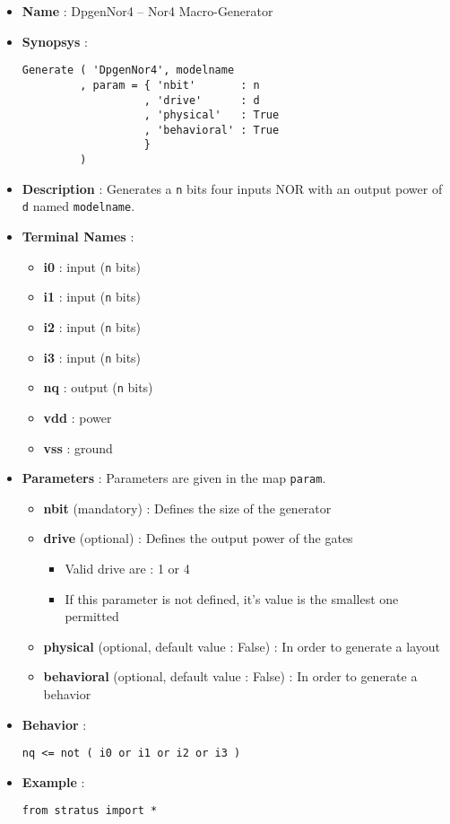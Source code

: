 \begin{itemize}
    \item \textbf{Name} : DpgenNor4 -- Nor4 Macro-Generator
    \item \textbf{Synopsys} :
\begin{verbatim}
Generate ( 'DpgenNor4', modelname
         , param = { 'nbit'       : n
                   , 'drive'      : d 
                   , 'physical'   : True
                   , 'behavioral' : True                   
                   }
         )
\end{verbatim}
    \item \textbf{Description} : Generates a \verb-n- bits four inputs NOR with an output power of \verb-d- named \verb-modelname-.
    \item \textbf{Terminal Names} :
    \begin{itemize}
        \item \textbf{i0} : input (\verb-n- bits)
        \item \textbf{i1} : input (\verb-n- bits)
        \item \textbf{i2} : input (\verb-n- bits)
        \item \textbf{i3} : input (\verb-n- bits)
        \item \textbf{nq} : output (\verb-n- bits)
        \item \textbf{vdd} : power
        \item \textbf{vss} : ground
    \end{itemize}
    \item \textbf{Parameters} : Parameters are given in the map \verb-param-.
    \begin{itemize}
        \item \textbf{nbit} (mandatory) : Defines the size of the generator
        \item \textbf{drive} (optional) : Defines the output power of the gates
        \begin{itemize}
            \item Valid drive are : 1 or 4
            \item If this parameter is not defined, it's value is the smallest one permitted
        \end{itemize}
        \item \textbf{physical} (optional, default value : False) : In order to generate a layout
        \item \textbf{behavioral} (optional, default value : False) : In order to generate a behavior        
    \end{itemize}
    \item \textbf{Behavior} :
\begin{verbatim}
nq <= not ( i0 or i1 or i2 or i3 )
\end{verbatim}
    \item \textbf{Example} :
\begin{verbatim}
from stratus import *


\end{verbatim}
\end{itemize}
